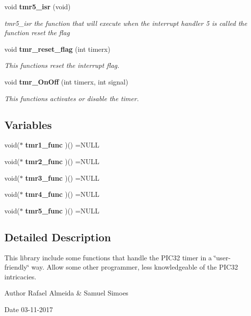 \begin{DoxyCompactItemize}
void \textbf{ tmr5\+\_\+isr} (void)
\begin{DoxyCompactList}\small\item\em tmr5\+\_\+isr the function that will execute when the interrupt handler 5 is called the function reset the flag \end{DoxyCompactList}\item 
void \textbf{ tmr\+\_\+reset\+\_\+flag} (int timerx)
\begin{DoxyCompactList}\small\item\em This functions reset the interrupt flag. \end{DoxyCompactList}\item 
void \textbf{ tmr\+\_\+\+On\+Off} (int timerx, int signal)
\begin{DoxyCompactList}\small\item\em This functions activates or disable the timer. \end{DoxyCompactList}\end{DoxyCompactItemize}
\subsection*{Variables}
\begin{DoxyCompactItemize}
\item 
void($\ast$ \textbf{ tmr1\+\_\+func} )() =N\+U\+LL
\item 
void($\ast$ \textbf{ tmr2\+\_\+func} )() =N\+U\+LL
\item 
void($\ast$ \textbf{ tmr3\+\_\+func} )() =N\+U\+LL
\item 
void($\ast$ \textbf{ tmr4\+\_\+func} )() =N\+U\+LL
\item 
void($\ast$ \textbf{ tmr5\+\_\+func} )() =N\+U\+LL
\end{DoxyCompactItemize}


\subsection{Detailed Description}
This library include some functions that handle the P\+I\+C32 timer in a \char`\"{}user-\/friendly\char`\"{} way. Allow some other programmer, less knowledgeable of the P\+I\+C32 intricacies. 

\begin{DoxyAuthor}{Author}
Rafael Almeida \& Samuel Simoes
\end{DoxyAuthor}
\begin{DoxyDate}{Date}
03-\/11-\/2017 
\end{DoxyDate}


